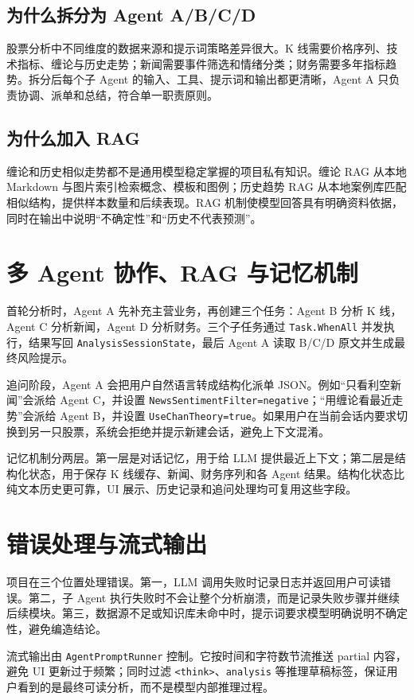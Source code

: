 \documentclass[UTF8,a4paper,11pt]{ctexart}
\begin{document}
\subsection{为什么拆分为 Agent A/B/C/D}
股票分析中不同维度的数据来源和提示词策略差异很大。K 线需要价格序列、技术指标、缠论与历史走势；新闻需要事件筛选和情绪分类；财务需要多年指标趋势。拆分后每个子 Agent 的输入、工具、提示词和输出都更清晰，Agent A 只负责协调、派单和总结，符合单一职责原则。

\subsection{为什么加入 RAG}
缠论和历史相似走势都不是通用模型稳定掌握的项目私有知识。缠论 RAG 从本地 Markdown 与图片索引检索概念、模板和图例；历史趋势 RAG 从本地案例库匹配相似结构，提供样本数量和后续表现。RAG 机制使模型回答具有明确资料依据，同时在输出中说明“不确定性”和“历史不代表预测”。

\section{多 Agent 协作、RAG 与记忆机制}
首轮分析时，Agent A 先补充主营业务，再创建三个任务：Agent B 分析 K 线，Agent C 分析新闻，Agent D 分析财务。三个子任务通过 \texttt{Task.WhenAll} 并发执行，结果写回 \texttt{AnalysisSessionState}，最后 Agent A 读取 B/C/D 原文并生成最终风险提示。

追问阶段，Agent A 会把用户自然语言转成结构化派单 JSON。例如“只看利空新闻”会派给 Agent C，并设置 \texttt{NewsSentimentFilter=negative}；“用缠论看最近走势”会派给 Agent B，并设置 \texttt{UseChanTheory=true}。如果用户在当前会话内要求切换到另一只股票，系统会拒绝并提示新建会话，避免上下文混淆。

记忆机制分两层。第一层是对话记忆，用于给 LLM 提供最近上下文；第二层是结构化状态，用于保存 K 线缓存、新闻、财务序列和各 Agent 结果。结构化状态比纯文本历史更可靠，UI 展示、历史记录和追问处理均可复用这些字段。

\section{错误处理与流式输出}
项目在三个位置处理错误。第一，LLM 调用失败时记录日志并返回用户可读错误。第二，子 Agent 执行失败时不会让整个分析崩溃，而是记录失败步骤并继续后续模块。第三，数据源不足或知识库未命中时，提示词要求模型明确说明不确定性，避免编造结论。

流式输出由 \texttt{AgentPromptRunner} 控制。它按时间和字符数节流推送 partial 内容，避免 UI 更新过于频繁；同时过滤 \texttt{<think>}、\texttt{analysis} 等推理草稿标签，保证用户看到的是最终可读分析，而不是模型内部推理过程。
\end{document}
